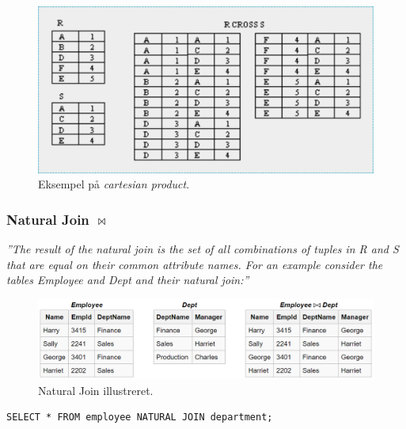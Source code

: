 \begin{figure}[H]
	\centering
	\includegraphics[width=0.6\linewidth]{figs/spm6/cartesianproduct}
	\caption{Eksempel på \textit{cartesian product}.}
	\label{fig:cartesian_product}
\end{figure}

\subsubsection{Natural Join $\Join$}

\textit{''The result of the natural join is the set of all combinations of tuples in R and S that are equal on their common attribute names. For an example consider the tables Employee and Dept and their natural join:''}



\begin{figure}[H]
\centering
\includegraphics[width=\linewidth]{figs/spm6/naturaljoin}
\caption{Natural Join illustreret.}
\label{fig:naturaljoin}
\end{figure}

\begin{lstlisting}[caption=SQL for Cross Join,label=code:crossjoin,morekeywords={SELECT, FROM, WHERE, CROSS, JOIN, NATURAL}]
SELECT * FROM employee NATURAL JOIN department;
\end{lstlisting}


